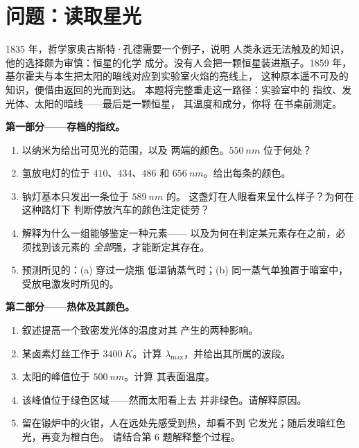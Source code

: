\section{问题：读取星光}

\begin{problem}
\label{pb:g10:light-spectra:1}
1835 年，哲学家奥古斯特·孔德需要一个例子，说明
人类永远无法触及的知识，他的选择颇为审慎：恒星的化学
成分。没有人会把一颗恒星装进瓶子。1859 年，
基尔霍夫与本生把太阳的暗线对应到实验室火焰的亮线上，
这种原本遥不可及的知识，便借由返回的光而到达。
本题将完整重走这一路径：实验室中的
指纹、发光体、太阳的暗线——最后是一颗恒星，
其温度和成分，你将
在书桌前测定。

\medskip
\noindent\textbf{第一部分——存档的指纹。}
\begin{enumerate}
  \item 以纳米为给出可见光的范围，以及
        两端的颜色。$\qty{550}{nm}$ 位于何处？
  \item 氢放电灯的位于 $410$、$434$、$486$
        和 $\qty{656}{nm}$。给出每条的颜色。
  \item 钠灯基本只发出一条位于 $\qty{589}{nm}$ 的。
        这盏灯在人眼看来呈什么样子？为何在这种路灯下
        判断停放汽车的颜色注定徒劳？
  \item 解释为什么一组能够鉴定一种元素——
        以及为何在判定某元素存在之前，必须找到该元素的
        \emph{全部}强，才能断定其存在。
  \item 预测所见的：(a) 穿过一烧瓶
        低温钠蒸气时；(b) 同一蒸气单独置于暗室中，
        受放电激发时所见的。
\end{enumerate}

\medskip
\noindent\textbf{第二部分——热体及其颜色。}
\begin{enumerate}[resume]
  \item 叙述提高一个致密发光体的温度对其
        产生的两种影响。
  \item 某卤素灯丝工作于 $\qty{3400}{K}$。计算
        $\lambda_{\max}$，并给出其所属的波段。
  \item 太阳的峰值位于 $\qty{500}{nm}$。计算
        其表面温度。
  \item 该峰值位于绿色区域——然而太阳看上去
        并非绿色。请解释原因。
  \item 留在锻炉中的火钳，人在远处先感受到热，却看不到
        它发光；随后发暗红色光，再变为橙白色。
        请结合第 6 题解释整个过程。
\end{enumerate}


\end{problem}
